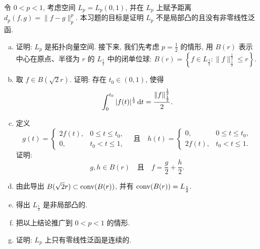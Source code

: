 \begin{exercise}[16]
  令 $0<p<1$, 考虑空间 $L_p=L_p(0,1)$, 并在 $L_p$ 上赋予距离 $d_{p}(f, g)=\|f-g\|_p^p$. 
  本习题的目标是证明 $L_p$ 不是局部凸的且没有非零线性泛函.
  \begin{enumerate}[(a)]
    \item 证明: $L_p$ 是拓扑向量空间.
      接下来, 我们先考虑 $p=\frac{1}{2}$ 的情形, 用 $B(r)$ 表示中心在原点、半径为 $r$ 的 $L_{\frac{1}{2}}$ 中的闭单位球: 
      $B(r)=\left\{f \in L_{\frac{1}{2}}\colon \|f\|_{\frac{1}{2}}^{\frac{1}{2}} \leqslant r\right\}$.
    \item 取 $f\in B(\sqrt{2}r)$. 证明: 存在 $t_0 \in(0,1)$, 使得
      \[
      \int_{0}^{t_0}|f(t)|^{\frac{1}{2}}\mathop{}\!\mathrm{d} t=\frac{\|f\|_{\frac{1}{2}}^{\frac{1}{2}}}{2}.
      \]
    \item 定义
      \[g(t)=
      \begin{cases}
          2f(t), & 0\leqslant t\leqslant t_{0}, \\
          0, & t_{0}<t\leqslant 1,
      \end{cases}\quad\text{且}\quad 
      h(t)=\begin{cases}
          0, & 0 \leqslant t \leqslant t_{0}, \\
          2f(t), & t_{0}<t \leqslant 1.
      \end{cases}\]
      证明:
      \[g, h \in B(r) \quad \text{且} \quad f=\frac{g}{2}+\frac{h}{2}.\]
    \item 由此导出 $B(\sqrt{2} r)\subset\operatorname{conv}(B(r))$, 并有 $\operatorname{conv}(B(r))=L_{\frac{1}{2}}$.
    \item 得出 $L_{\frac{1}{2}}$ 是非局部凸的.
    \item 把以上结论推广到 $0<p<1$ 的情形.
    \item 证明: $L_{p}$ 上只有零线性泛函是连续的.
  \end{enumerate}
\end{exercise}

